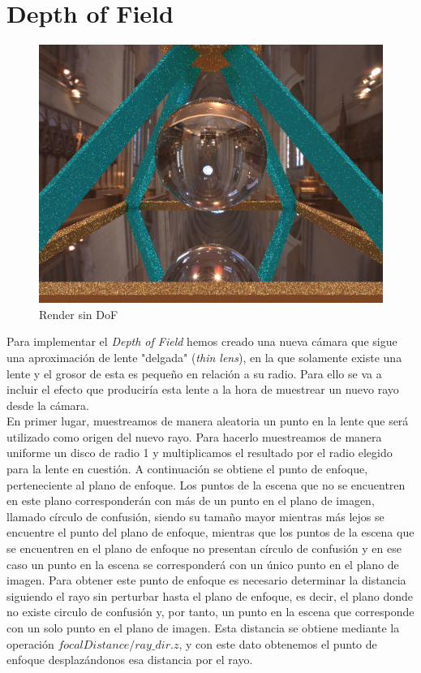 \documentclass[10pt,oneside,a4paper]{article}
\begin{document}
\section{Depth of Field}

\begin{figure}[h]
\centering
\includegraphics[width=1\linewidth]{images/escena_2400x1800_128spp_dof0-0_screencap.png}
\caption{Render sin DoF}
\label{fig:disp}
\end{figure}

Para implementar el \textit{Depth of Field} hemos creado una nueva cámara que sigue una aproximación de lente "delgada" (\textit{thin lens}), en la que solamente existe una lente y el grosor de esta es pequeño en relación a su radio. Para ello se va a incluir el efecto que produciría esta lente a la hora de muestrear un nuevo rayo desde la cámara.\\

En primer lugar, muestreamos de manera aleatoria un punto en la lente que será utilizado como origen del nuevo rayo. Para hacerlo muestreamos de manera uniforme un disco de radio 1 y multiplicamos el resultado por el radio elegido para la lente en cuestión. A continuación se obtiene el punto de enfoque, perteneciente al plano de enfoque. Los puntos de la escena que no se encuentren en este plano corresponderán con más de un punto en el plano de imagen, llamado círculo de confusión, siendo su tamaño mayor mientras más lejos se encuentre el punto del plano de enfoque, mientras que los puntos de la escena que se encuentren en el plano de enfoque no presentan círculo de confusión y en ese caso un punto en la escena se corresponderá con un único punto en el plano de imagen. Para obtener este punto de enfoque es necesario determinar la distancia siguiendo el rayo sin perturbar hasta el plano de enfoque, es decir, el plano donde no existe circulo de confusión y, por tanto, un punto en la escena que corresponde con un solo punto en el plano de imagen. Esta distancia se obtiene mediante la operación $focalDistance/ ray\_dir.z$, y con este dato obtenemos el punto de enfoque desplazándonos esa distancia por el rayo.\\
\end{document}
